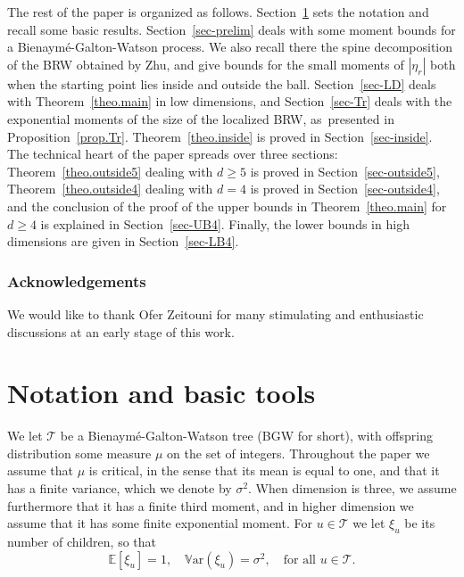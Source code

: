 The rest of the paper is organized as follows.
Section~\ref{sec-notation} sets the notation and
recall some basic results.
Section~\ref{sec-prelim} deals with some moment bounds for
a Bienaymé-Galton-Watson process. We also
recall there the spine decomposition of the BRW obtained by Zhu,
and give bounds for the small moments of
$|\eta_r|$ both when the starting point lies inside and outside the ball.
Section~\ref{sec-LD} deals with Theorem~\ref{theo.main} in low dimensions,
and Section~\ref{sec-Tr} deals with the
exponential moments of the size of the localized BRW, as~presented in Proposition~\ref{prop.Tr}. Theorem~\ref{theo.inside} is proved
in Section~\ref{sec-inside}. The technical heart of the paper
spreads over three sections: Theorem~\ref{theo.outside5} dealing with $d\ge 5$ is proved in
Section~\ref{sec-outside5}, Theorem~\ref{theo.outside4} dealing with $d=4$ is proved in Section~\ref{sec-outside4}, and the conclusion of the proof of the upper bounds in Theorem~\ref{theo.main} for $d\ge 4$ is explained in Section~\ref{sec-UB4}. Finally, the lower
bounds in high dimensions are given in Section~\ref{sec-LB4}.

\subsubsection*{Acknowledgements}
We would like to thank Ofer Zeitouni for many stimulating and enthusiastic discussions at an early stage of this work.

\section{Notation and basic tools}\label{sec-notation}

We let $\mathbf{\mathcal T}$ be a Bienaymé-Galton-Watson tree (BGW for short),
with offspring distribution some measure $\mu$ on the set of integers. Throughout the paper we assume that $\mu$ is critical, in the sense that its mean is equal to one, and that it has a finite variance, which we denote by $\sigma^2$.
When dimension is three, we assume furthermore that it has a finite third moment, and in higher dimension we assume that it has some finite exponential moment.
For $u\in \mathbf{\mathcal T}$
we let $\xi_u$ be its number of children, so that
\[
\mathbb E[\xi_u]= 1, \quad \mathbb V\text{ar}(\xi_u)= \sigma^2,
\quad \text{for all }u \in \mathbf{\mathcal T}.
\]

